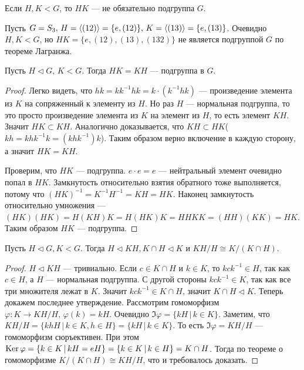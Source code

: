 \documentclass[../main.tex]{subfiles}
\begin{document}
\begin{remark}
  Если $H, K < G$, то $HK$ --- не обязательно подгруппа $G$.
\end{remark}
\begin{example}
  Пусть $G = S_3, \, H = \left\langle (12) \right\rangle = \{e, (12)\}, \, K = \left\langle (13) \right\rangle = \{e, (13)\}$. Очевидно $H, K < G$, но $HK = \{e, (12), (13), (132)\}$ не является подгруппой $G$ по теореме Лагранжа.
\end{example}

\begin{statement}
  Пусть $H \triangleleft G,\, K < G$. Тогда $HK = KH$ --- подгруппа в $G$.
\end{statement}
\begin{proof}
  Легко видеть, что $hk = kk^{-1}hk = k \cdot (k^{-1} hk)$ --- произведение элемента из $K$ на сопряженный к элементу из $H$. Но раз $H$ --- нормальная подгруппа, то это просто произведение элемента из $K$ на элемент из $H$, то есть элемент $KH$. Значит $HK \subset KH$. Аналогично доказывается, что $KH \subset HK$($kh = khk^{-1}k = (khk^{-1})k$). Таким образом верно включение в каждую сторону, а значит $HK = KH$.

  Проверим, что $HK$ --- подгруппа. $e \cdot e = e$ --- нейтральный элемент очевидно попал в $HK$. Замкнутость относительно взятия обратного тоже выполняется, потому что $(HK)^{-1} = K^{-1}H^{-1} = KH = HK$. Наконец замкнутость относительно умножения --- $(HK)(HK) = H(KH)K = H(HK)K = HHKK = (HH)(KK) = HK$. Таким образом $HK$ --- подгруппа.
\end{proof}

\begin{theorem}
  Пусть $H \triangleleft G, K < G$. Тогда $H \triangleleft KH, K\cap H \triangleleft K$ и $KH/H \cong K/(K \cap H)$.
\end{theorem}
\begin{proof}
  $H \triangleleft KH$ --- тривиально. Если $c \in K \cap H$ и $k \in K$, то $kck^{-1} \in H$, так как $c \in H$, а $H$ --- нормальная подгруппа. С другой стороны $kck^{-1} \in K$, так как все три множителя лежат в $K$. Значит $kck^{-1} \in K \cap H$, значит $K \cap H \triangleleft K$. Теперь докажем последнее утверждение. Рассмотрим гомоморфизм $\varphi\colon K \to KH/H,\, \varphi(k) = kH$. Очевидно $\Im \varphi = \{kH \, | \, k \in K\}$. Заметим, что $KH/H = \{khH \, | \, k \in K, h \in H\} = \{kH \, | \, k \in K\}$. То есть $\Im \varphi = KH / H$ --- гомоморфизм сюръективен. При этом $\operatorname{Ker} \varphi = \{k \in K \, | \, kH = eH\} = \{k \in K \, | \, k \in H\} = K \cap H$. Тогда по теореме о гомоморфизме $K/(K\cap H) \cong KH/H$, что и требовалось доказать.
\end{proof}
\end{document}
